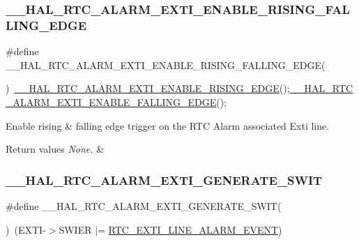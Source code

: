 \subsubsection{\texorpdfstring{\+\_\+\+\_\+\+H\+A\+L\+\_\+\+R\+T\+C\+\_\+\+A\+L\+A\+R\+M\+\_\+\+E\+X\+T\+I\+\_\+\+E\+N\+A\+B\+L\+E\+\_\+\+R\+I\+S\+I\+N\+G\+\_\+\+F\+A\+L\+L\+I\+N\+G\+\_\+\+E\+D\+GE}{\_\_HAL\_RTC\_ALARM\_EXTI\_ENABLE\_RISING\_FALLING\_EDGE}}
{\footnotesize\ttfamily \#define \+\_\+\+\_\+\+H\+A\+L\+\_\+\+R\+T\+C\+\_\+\+A\+L\+A\+R\+M\+\_\+\+E\+X\+T\+I\+\_\+\+E\+N\+A\+B\+L\+E\+\_\+\+R\+I\+S\+I\+N\+G\+\_\+\+F\+A\+L\+L\+I\+N\+G\+\_\+\+E\+D\+GE(\begin{DoxyParamCaption}{ }\end{DoxyParamCaption})~\hyperlink{group___r_t_c___exported___macros_ga9d6c820076d2e583f6354f4e37217d1b}{\+\_\+\+\_\+\+H\+A\+L\+\_\+\+R\+T\+C\+\_\+\+A\+L\+A\+R\+M\+\_\+\+E\+X\+T\+I\+\_\+\+E\+N\+A\+B\+L\+E\+\_\+\+R\+I\+S\+I\+N\+G\+\_\+\+E\+D\+GE}();\hyperlink{group___r_t_c___exported___macros_gafb2f49d2954f9ea1dae2ec92156d7b87}{\+\_\+\+\_\+\+H\+A\+L\+\_\+\+R\+T\+C\+\_\+\+A\+L\+A\+R\+M\+\_\+\+E\+X\+T\+I\+\_\+\+E\+N\+A\+B\+L\+E\+\_\+\+F\+A\+L\+L\+I\+N\+G\+\_\+\+E\+D\+GE}();}



Enable rising \& falling edge trigger on the R\+TC Alarm associated Exti line. 


\begin{DoxyRetVals}{Return values}
{\em None.} & \\
\hline
\end{DoxyRetVals}
\mbox{\label{group___r_t_c___exported___macros_ga0ea6a0ad763bcc1913468b57f3972cb2}} 
\subsubsection{\texorpdfstring{\+\_\+\+\_\+\+H\+A\+L\+\_\+\+R\+T\+C\+\_\+\+A\+L\+A\+R\+M\+\_\+\+E\+X\+T\+I\+\_\+\+G\+E\+N\+E\+R\+A\+T\+E\+\_\+\+S\+W\+IT}{\_\_HAL\_RTC\_ALARM\_EXTI\_GENERATE\_SWIT}}
{\footnotesize\ttfamily \#define \+\_\+\+\_\+\+H\+A\+L\+\_\+\+R\+T\+C\+\_\+\+A\+L\+A\+R\+M\+\_\+\+E\+X\+T\+I\+\_\+\+G\+E\+N\+E\+R\+A\+T\+E\+\_\+\+S\+W\+IT(\begin{DoxyParamCaption}{ }\end{DoxyParamCaption})~(E\+X\+TI-\/$>$S\+W\+I\+ER $\vert$= \hyperlink{group___r_t_c___private___constants_gaeffe9b89372b06df1c0eff2f4346682b}{R\+T\+C\+\_\+\+E\+X\+T\+I\+\_\+\+L\+I\+N\+E\+\_\+\+A\+L\+A\+R\+M\+\_\+\+E\+V\+E\+NT})}



